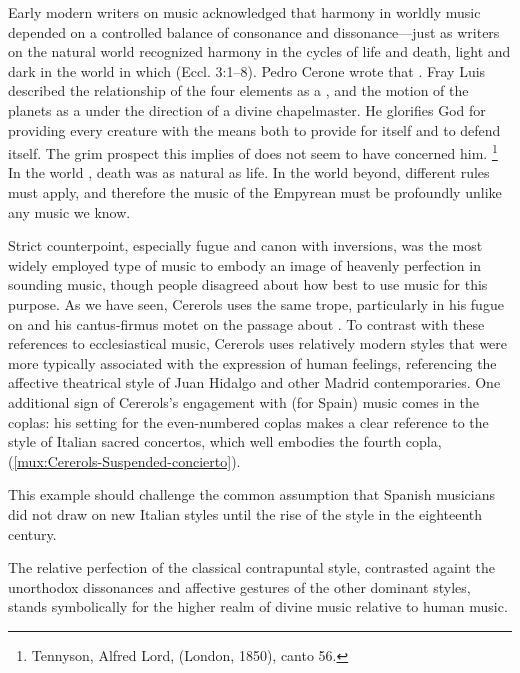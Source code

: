 Early modern writers on music acknowledged that harmony in worldly music
depended on a controlled balance of consonance and dissonance---just as writers
on the natural world recognized harmony in the cycles of life and death, light
and dark in the world in which  (Eccl. 3:1--8).
Pedro Cerone wrote that .%
    \Autocite[616]{Cerone:Melopeo}
Fray Luis described the relationship of the four elements as a , and the motion of the planets as a  under the
direction of a divine chapelmaster.%
    \Autocite[191]{LuisdeGranada:Simbolo}
He glorifies God for providing every creature with the means both to provide
for itself and to defend itself. 
The grim prospect this implies of  does
not seem to have concerned him.%
    \footnote{Tennyson, Alfred Lord,  (London,
    1850), canto 56.}
In the world , death was as natural as life.
In the world beyond, different rules must apply, and therefore the music of the
Empyrean must be profoundly unlike any music we know.

Strict counterpoint, especially fugue and canon with inversions, was the most
widely employed type of music to embody an image of heavenly perfection in
sounding music, though people disagreed about how best to use music for this
purpose.%
    \Autocites{Yearsley:Buxtehude}
As we have seen, Cererols uses the same trope, particularly in his fugue on
 and his cantus-firmus motet on the passage about
.
To contrast with these references to ecclesiastical music, Cererols uses
relatively modern styles that were more typically associated with the expression
of human feelings, referencing the affective theatrical style of Juan Hidalgo
and other Madrid contemporaries.
One additional sign of Cererols's engagement with (for Spain) 
music comes in the coplas: his setting for the even-numbered coplas makes a
clear reference to the style of Italian sacred concertos, which well embodies
the fourth copla, 
(\cref{mux:Cererols-Suspended-concierto}).%
\begin{Footnote}
    This example should challenge the common assumption that Spanish musicians
    did not draw on new Italian styles until the rise of the  style
    in the eighteenth century.
\end{Footnote}
The relative perfection of the classical contrapuntal style, contrasted againt
the unorthodox dissonances and affective gestures of the other dominant styles,
stands symbolically for the higher realm of divine music relative to human
music.

